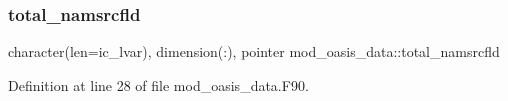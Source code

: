 \mbox{\label{namespacemod__oasis__data_a58b5a440f274f5dfb942d7e18f12674c}} 
\subsubsection{\texorpdfstring{total\+\_\+namsrcfld}{total\_namsrcfld}}
{\footnotesize\ttfamily character(len=ic\+\_\+lvar), dimension(\+:), pointer mod\+\_\+oasis\+\_\+data\+::total\+\_\+namsrcfld}



Definition at line 28 of file mod\+\_\+oasis\+\_\+data.\+F90.

